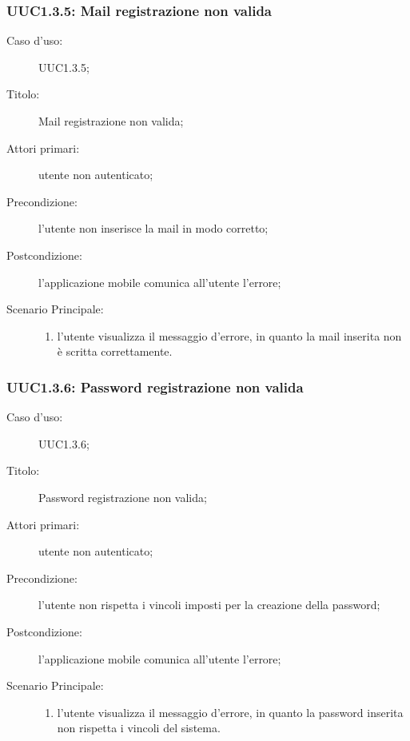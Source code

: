 \documentclass[../../../analisi-dei-requisiti.tex]{subfiles}
\begin{document}
\subsubsection{UUC1.3.5: Mail registrazione non valida}%
\label{subs:UUC1.3.5}
\begin{description}
  \item[Caso d’uso:] UUC1.3.5;
  \item[Titolo:] Mail registrazione non valida;
  \item[Attori primari:] utente non autenticato;
  \item[Precondizione:] l'utente non inserisce la mail in modo corretto;
  \item[Postcondizione:] l'applicazione mobile comunica all'utente l'errore;
  \item[Scenario Principale:]
        \begin{enumerate}
          \item l'utente visualizza il messaggio d'errore, in quanto la mail inserita non è scritta correttamente.
        \end{enumerate}
\end{description}

\subsubsection{UUC1.3.6: Password registrazione non valida}%
\label{subs:UUC1.3.6}
\begin{description}
  \item[Caso d’uso:] UUC1.3.6;
  \item[Titolo:] Password registrazione non valida;
  \item[Attori primari:] utente non autenticato;
  \item[Precondizione:] l'utente non rispetta i vincoli imposti per la creazione della password;
  \item[Postcondizione:] l'applicazione mobile comunica all'utente l'errore;
  \item[Scenario Principale:]
        \begin{enumerate}
          \item l'utente visualizza il messaggio d'errore, in quanto la password inserita non rispetta i vincoli del sistema.
        \end{enumerate}
\end{description}
\end{document}
